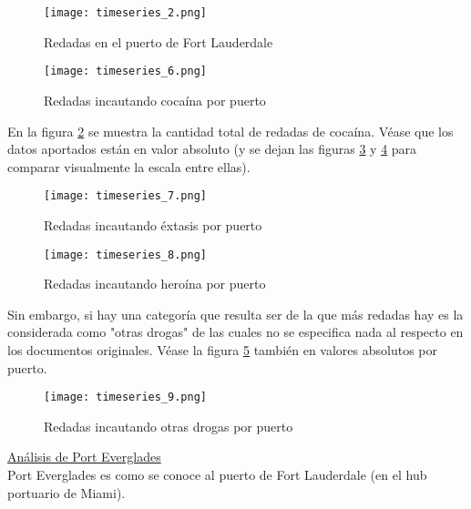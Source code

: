 \documentclass[12pt]{article}
\begin{document}
		\begin{figure}[H]
			\caption{\label{timeseries_2} Redadas en el puerto de Fort Lauderdale}
			\centering
			\hspace*{1cm}
			\texttt{[image: timeseries\_2.png]}
		\end{figure}
	
		\begin{figure}[H]
			\caption{\label{timeseries_6} Redadas incautando cocaína por puerto}
			\centering
			\hspace*{1cm}
			\texttt{[image: timeseries\_6.png]}
		\end{figure}
	
		En la figura \ref{timeseries_6} se muestra la cantidad total de redadas de cocaína. Véase que los datos aportados están en valor absoluto (y se dejan las figuras \ref{timeseries_7} y  \ref{timeseries_8} para comparar visualmente la escala entre ellas).
		
		\begin{figure}[H]
			\caption{\label{timeseries_7} Redadas incautando éxtasis por puerto}
			\centering
			\hspace*{1cm}
			\texttt{[image: timeseries\_7.png]}
		\end{figure}
	
		\begin{figure}[H]
			\caption{\label{timeseries_8} Redadas incautando heroína por puerto}
			\centering
			\hspace*{1cm}
			\texttt{[image: timeseries\_8.png]}
		\end{figure}
	
		Sin embargo, si hay una categoría que resulta ser de la que más redadas hay es la considerada como "otras drogas" de las cuales no se especifica nada al respecto en los documentos originales. Véase la figura \ref{timeseries_9} también en valores absolutos por puerto.
		
		\begin{figure}[H]
			\caption{\label{timeseries_9} Redadas incautando otras drogas por puerto}
			\centering
			\hspace*{1cm}
			\texttt{[image: timeseries\_9.png]}
		\end{figure}
	
		\underline{Análisis de Port Everglades}\\
		Port Everglades es como se conoce al puerto de Fort Lauderdale (en el hub portuario de Miami).
		
\end{document}
